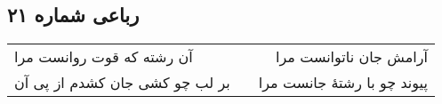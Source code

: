 \begin{center}
\section*{رباعی شماره ۲۱}
\label{sec:sh021}
\begin{longtable}{l p{0.5cm} r}
آن رشته که قوت روانست مرا
&&
آرامش جان ناتوانست مرا
\\
بر لب چو کشی جان کشدم از پی آن
&&
پیوند چو با رشتهٔ جانست مرا
\\
\end{longtable}
\end{center}
